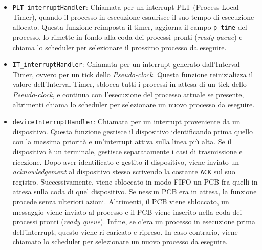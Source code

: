 \documentclass[a4paper]{article}
\begin{document}
\begin{itemize}
\item \verb+PLT_interruptHandler+: Chiamata per un interrupt PLT (Process Local Timer), quando il processo in esecuzione esaurisce il suo tempo di esecuzione allocato. Questa funzione reimposta il timer, aggiorna il campo \verb+p_time+ del processo, lo rimette in fondo alla coda dei processi pronti (\textit{ready queue}) e chiama lo scheduler per selezionare il prossimo processo da eseguire.

\item \texttt{IT\_interruptHandler}: Chiamata per un interrupt generato dall'Interval Timer, ovvero per un tick dello \textit{Pseudo-clock}. Questa funzione reinizializza il valore dell'Interval Timer, sblocca tutti i processi in attesa di un tick dello \textit{Pseudo-clock}, e continua con l'esecuzione del processo attuale se presente, altrimenti chiama lo scheduler per selezionare un nuovo processo da eseguire.

\item \texttt{deviceInterruptHandler}: Chiamata per un interrupt proveniente da un dispositivo. Questa funzione gestisce il dispositivo identificando prima quello con la massima priorità e un'interrupt attiva sulla linea più alta. Se il dispositivo è un terminale, gestisce separatamente i casi di trasmissione e ricezione. Dopo aver identificato e gestito il dispositivo, viene inviato un \textit{acknowledgement} al dispositivo stesso scrivendo la costante \texttt{ACK} sul suo registro. Successivamente, viene sbloccato in modo FIFO un PCB fra quelli in attesa sulla coda di quel dispositivo. Se nessun PCB era in attesa, la funzione procede senza ulteriori azioni. Altrimenti, il PCB viene sbloccato, un messaggio viene inviato al processo e il PCB viene inserito nella coda dei processi pronti (\textit{ready queue}). Infine, se c'era un processo in esecuzione prima dell'interrupt, questo viene ri-caricato e ripreso. In caso contrario, viene chiamato lo scheduler per selezionare un nuovo processo da eseguire.

\end{itemize}
\end{document}

